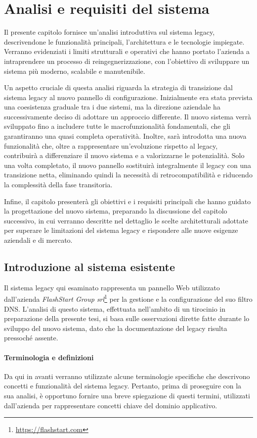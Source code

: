\chapter{Analisi e requisiti del sistema}
Il presente capitolo fornisce un'analisi introduttiva sul sistema legacy, descrivendone le funzionalità principali, l'architettura e le tecnologie impiegate. Verranno evidenziati i limiti strutturali e operativi che hanno portato l'azienda a intraprendere un processo di reingegnerizzazione, con l'obiettivo di sviluppare un sistema più moderno, scalabile e manutenibile.

Un aspetto cruciale di questa analisi riguarda la strategia di transizione dal sistema legacy al nuovo pannello di configurazione. Inizialmente era stata prevista una coesistenza graduale tra i due sistemi, ma la direzione aziendale ha successivamente deciso di adottare un approccio differente. Il nuovo sistema verrà sviluppato fino a includere tutte le macrofunzionalità fondamentali, che gli garantiranno una quasi completa operatività. Inoltre, sarà introdotta una nuova funzionalità che, oltre a rappresentare un'evoluzione rispetto al legacy, contribuirà a differenziare il nuovo sistema e a valorizzarne le potenzialità.
%
Solo una volta completato, il nuovo pannello sostituirà integralmente il legacy con una transizione netta, eliminando quindi la necessità di retrocompatibilità e riducendo la complessità della fase transitoria.

Infine, il capitolo presenterà gli obiettivi e i requisiti principali che hanno guidato la progettazione del nuovo sistema, preparando la discussione del capitolo successivo, in cui verranno descritte nel dettaglio le scelte architetturali adottate per superare le limitazioni del sistema legacy e rispondere alle nuove esigenze aziendali e di mercato.

\section{Introduzione al sistema esistente}
Il sistema legacy qui esaminato rappresenta un pannello Web utilizzato dall'azienda \textit{FlashStart Group srl}\footnote{\url{https://flashstart.com}} per la gestione e la configurazione del suo filtro DNS. L’analisi di questo sistema, effettuata nell’ambito di un tirocinio in preparazione della presente tesi, si basa sulle osservazioni dirette fatte durante lo sviluppo del nuovo sistema, dato che la documentazione del legacy risulta pressoché assente.

\subsubsection{Terminologia e definizioni}
Da qui in avanti verranno utilizzate alcune terminologie specifiche che descrivono concetti e funzionalità del sistema legacy. Pertanto, prima di proseguire con la sua analisi, è opportuno fornire una breve spiegazione di questi termini, utilizzati dall'azienda per rappresentare concetti chiave del dominio applicativo.

